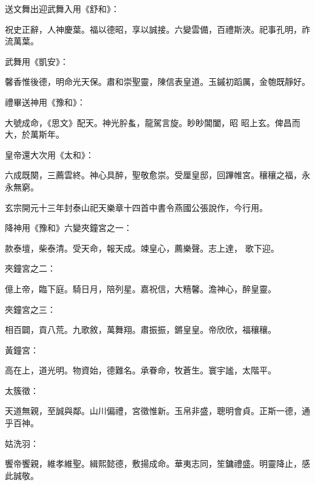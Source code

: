 \begin{pinyinscope}
 送文舞出迎武舞入用《舒和》：



 祝史正辭，人神慶葉。福以德昭，享以誠接。六變雲備，百禮斯浹。祀事孔明，祚流萬葉。



 武舞用《凱安》：



 馨香惟後德，明命光天保。肅和崇聖靈，陳信表皇道。玉鏚初蹈厲，金匏既靜好。



 禮畢送神用《豫和》：



 大號成命，《思文》配天。神光肸蚃，龍駕言旋。眇眇閶闔，昭
 昭上玄。俾昌而大，於萬斯年。



 皇帝還大次用《太和》：



 六成既闋，三薦雲終。神心具醉，聖敬愈崇。受厘皇邸，回蹕帷宮。穰穰之福，永永無窮。



 玄宗開元十三年封泰山祀天樂章十四首中書令燕國公張說作，今行用。



 降神用《豫和》六變夾鐘宮之一：



 款泰壇，柴泰清。受天命，報天成。竦皇心，薦樂聲。志上達，
 歌下迎。



 夾鐘宮之二：



 億上帝，臨下庭。騎日月，陪列星。嘉祝信，大糦馨。澹神心，醉皇靈。



 夾鐘宮之三：



 相百闢，貢八荒。九歌敘，萬舞翔。肅振振，鏘皇皇。帝欣欣，福穰穰。



 黃鐘宮：



 高在上，道光明。物資始，德難名。承眷命，牧蒼生。寰宇謐，太階平。



 太簇徵：



 天道無親，至誠與鄰。山川偏禮，宮徵惟新。玉帛非盛，聰明會貞。正斯一德，通乎百神。



 姑洗羽：



 饗帝饗親，維孝維聖。緝熙懿德，敷揚成命。華夷志同，笙鏞禮盛。明靈降止，感此誠敬。




\end{pinyinscope}
